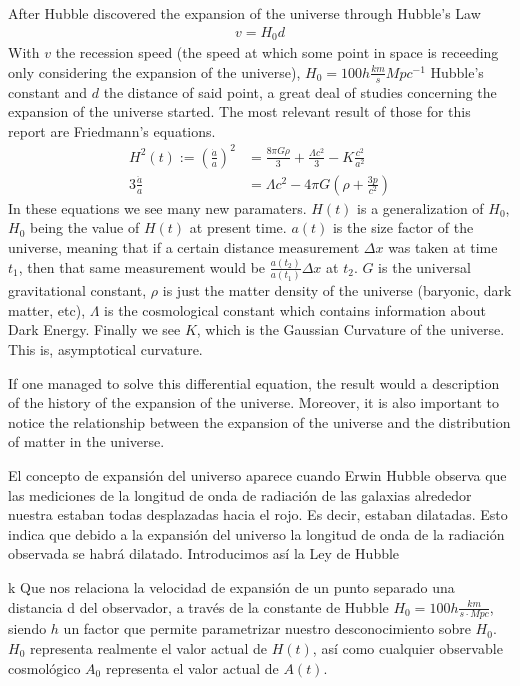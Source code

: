 After Hubble discovered the expansion of the universe through Hubble's Law
\begin{align}
	v = H_0 d
	\label{eq:ley-hubble}
\end{align}
With $v$ the recession speed (the speed at which some point in space is receeding only considering the expansion of the universe), $H_0=100h \frac{km}{s}Mpc ^{-1}$ Hubble's constant and $d$ the distance of said point, a great deal of studies concerning the expansion of the universe started. The most relevant result of those for this report are Friedmann's equations.
\begin{align}
	H^2(t) := \left(\frac{\dot a}{a}\right)^2 &=  \frac{8\pi G \rho}{3} +\frac{  \Lambda c^2}{3} - K \frac{c^2}{a^2}
	\label{eq:1a-friedmann}\\
	3 \frac{\ddot a}{a} &= \Lambda c^2 - 4\pi G \left( \rho + \frac{3p}{c^2} \right) 
	\label{eq:2a-friedmann}
\end{align}
In these equations we see many new paramaters. $H(t)$ is a generalization of $H_0$, $H_0$ being the value of $H(t)$ at present time. $a(t)$ is the size factor of the universe, meaning that if a certain distance measurement $\Delta x$ was taken at time $t_1$, then that same measurement would be $\frac{a(t_2)}{a(t_1)}\Delta x$ at $t_2$. $G$ is the universal gravitational constant, $\rho$ is just the matter density of the universe (baryonic, dark matter, etc), $\Lambda$ is the cosmological constant which contains information about Dark Energy. Finally we see $K$, which is the Gaussian Curvature of the universe. This is, asymptotical curvature.

If one managed to solve this differential equation, the result would a description of the history of the expansion of the universe. Moreover, it is also important to notice the relationship between the expansion of the universe and the distribution of matter in the universe.



El concepto de expansión del universo aparece cuando Erwin Hubble observa que las mediciones de la longitud de onda de radiación de las galaxias alrededor nuestra estaban todas desplazadas hacia el rojo. Es decir, estaban dilatadas. Esto indica que debido a la expansión del universo la longitud de onda de la radiación observada se habrá dilatado. Introducimos así la Ley de Hubble 

k
Que nos relaciona la velocidad de expansión de un punto separado una distancia d del observador, a través de la constante de Hubble $H_0 = 100h \frac{km}{s \cdot Mpc}$, siendo $h$ un factor que permite parametrizar nuestro desconocimiento sobre $H_0$. $H_0$ representa realmente el valor actual de $H(t)$, así como cualquier observable cosmológico $A_0$ representa el valor actual de $A(t)$. 

